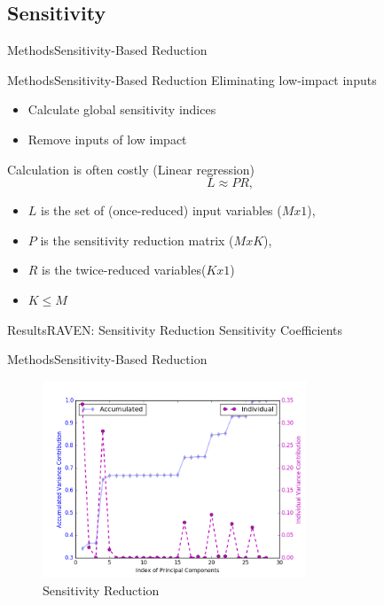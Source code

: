\documentclass{beamer}
\begin{document}
\subsection{Sensitivity}
\begin{frame}{Methods}{Sensitivity-Based Reduction}
\end{frame}

\begin{frame}{Methods}{Sensitivity-Based Reduction}
  \vfill
  Eliminating low-impact inputs
  \vfill
  \begin{itemize}
    \item Calculate global sensitivity indices
  \vfill
    \item Remove inputs of low impact
  \end{itemize}
  \vfill
  Calculation is often costly (Linear regression)
  \begin{equation}
    L \approx P R, \nonumber
  \end{equation}
  \vfill
  \begin{itemize}
    \item $L$ is the set of (once-reduced) input variables ($Mx1$),
  \vfill
    \item $P$ is the sensitivity reduction matrix ($MxK$),
  \vfill
    \item $R$ is the twice-reduced variables($Kx1$)
  \vfill
    \item $K \leq M$
  \end{itemize}
  \vfill
\end{frame}

\begin{frame}{Results}{RAVEN: Sensitivity Reduction}
\vfill
  Sensitivity Coefficients
  
\vfill
\end{frame}

\begin{frame}{Methods}{Sensitivity-Based Reduction}
  \begin{figure}[h!]
    \centering
      \includegraphics[width=0.7\textwidth]{graphics/variance_contribs_example.png}
      \caption{Sensitivity Reduction}
  \end{figure}
\end{frame}
\end{document}
